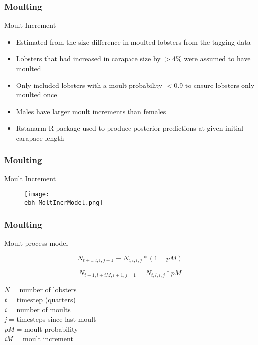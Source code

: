 \documentclass{beamer}
\newcommand{\ebh}{\string~/bio.data/bio.lobster/figures/LFA2733Framework2018/} %
\begin{document}
\begin{frame}
\frametitle{Moulting}
Moult Increment 
\begin{itemize}
\item Estimated from the size difference in moulted lobsters from the tagging data
\item Lobsters that had increased in carapace size by $>$4\% were assumed to have moulted
\item Only included lobsters with a moult probability $<$0.9 to ensure lobsters only moulted once 
\item Males have larger moult increments than females
\item Rstanarm R package used to produce posterior predictions at given initial carapace length
\end{itemize}
\end{frame}


\begin{frame}
\frametitle{Moulting}
Moult Increment 
\begin{figure}
        \begin{center}
            \texttt{[image: \\ebh MoltIncrModel.png]}
        \end{center}
    \end{figure}
\end{frame}


\begin{frame}
\frametitle{Moulting}
Moult process model 

\begin{equation*}
    N_{t+1, l, i, j+1} = N_{t, l, i, j} * (1 - pM)
\end{equation*}


\begin{equation*}
    N_{t+1, l+iM, i+1, j=1} = N_{t, l, i, j} * pM
\end{equation*}



\textit{N} = number of lobsters\\
\textit{t} = timestep (quarters)\\
\textit{i} = number of moults\\
\textit{j} = timesteps since last moult\\
\textit{pM} = moult probability\\
\textit{iM} = moult increment


\end{frame}
\end{document}
